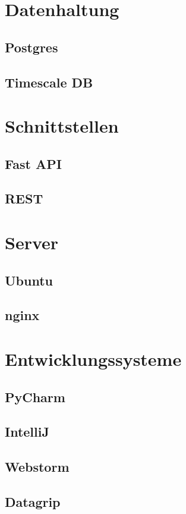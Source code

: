 \documentclass[pdftex,11pt,a4paper]{book}
\begin{document}
\section{Datenhaltung}
\subsection{Postgres}
\subsection{Timescale DB}

\section{Schnittstellen}
\subsection{Fast API}
\subsection{REST}

\section{Server}
\subsection{Ubuntu}
\subsection{nginx}

\section{Entwicklungssysteme}
\subsection{PyCharm}
\subsection{IntelliJ}
\subsection{Webstorm}
\subsection{Datagrip}
\end{document}
